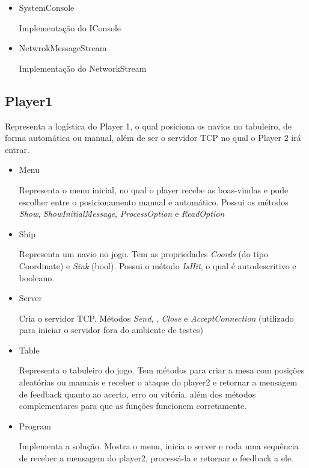 \documentclass[
	12pt,				%
	oneside,			%
	a4paper,			%
	english,			%
	brazil,				%
	]{abntex2}
\begin{document}
{\begin{itemize}
    Interface do NetworkStream. Feita para permitir injeção de dependência que vem a facilitar testes unitários. Possui os métodos \textit{Send}, \textit {Receive} e \textit{Close}
    \item SystemConsole

    Implementação do IConsole
    \item NetwrokMessageStream

    Implementação do NetworkStream
\end{itemize}

\subsection{Player1}
Representa a logística do  Player 1, o qual posiciona os navios no tabuleiro, de forma automática ou manual, além de ser o servidor TCP no qual o Player 2 irá entrar.

\begin{itemize}
    \item Menu

    Representa o menu inicial, no qual o player recebe as boas-vindas e pode escolher entre o posicionamento manual e automático. Possui os métodos \textit{Show}, \textit{ShowInitialMessage}, \textit{ProcessOption} e \textit{ReadOption}
    \item Ship

    Representa um navio no jogo. Tem as propriedades \textit{Coords} (do tipo Coordinate) e \textit{Sink} (bool). Possui o método \textit{IsHit}, o qual é autodescritivo e booleano.
    \item Server

    Cria o servidor TCP. Métodos \textit{Send}, , \textit{Close} e \textit{AcceptConnection} (utilizado para iniciar o servidor fora do ambiente de testes)
    \item Table

    Representa o tabuleiro do jogo. Tem métodos para criar a mesa com posições aleatórias ou manuais e receber o ataque do player2 e retornar a mensagem de feedback quanto ao acerto, erro ou vitória, além dos métodos complementares para que as funções funcionem corretamente.
    \item Program

    Implementa a solução. Mostra o menu, inicia o server e roda uma sequência de receber a mensagem do player2, processá-la e retornar o feedback a ele.
    \end{itemize}

}
\end{document}
